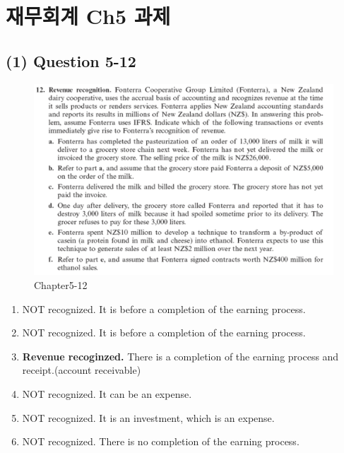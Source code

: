 \documentclass[
  letterpaper,
  DIV=11,
  numbers=noendperiod]{scrreprt}
\providecommand{\tightlist}{%
  \setlength{\itemsep}{0pt}\setlength{\parskip}{0pt}}\usepackage{longtable,booktabs,array}
\begin{document}
\chapter*{재무회계 Ch5
과제}\label{uxc7acuxbb34uxd68cuxacc4-ch5-uxacfcuxc81c}


\section*{(1) Question 5-12}\label{question-5-12}


\begin{figure}[H]

{\centering \includegraphics{images/재무회계_5-12.png}

}

\caption{Chapter5-12}

\end{figure}%

\begin{enumerate}
\def\labelenumi{(\alph{enumi})}
\tightlist
\item
  NOT recognized. It is before a completion of the earning process.
\item
  NOT recognized. It is before a completion of the earning process.
\item
  \textbf{Revenue recoginzed.} There is a completion of the earning
  process and receipt.(account receivable)
\item
  NOT recognized. It can be an expense.
\item
  NOT recognized. It is an investment, which is an expense.
\item
  NOT recognized. There is no completion of the earning process.
\end{enumerate}
\end{document}
